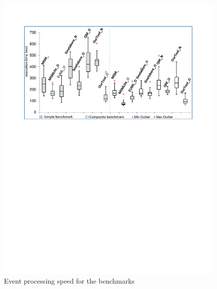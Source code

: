 \begin{figure}
	\centering
	\includegraphics[clip, trim=2.1cm 16.0cm 1.7cm 2.3cm, width=\columnwidth]{experiments/box-plot-mine.pdf}
	\caption{Event processing speed for the benchmarks} 
	\label{fig:boxplot}
\end{figure}

